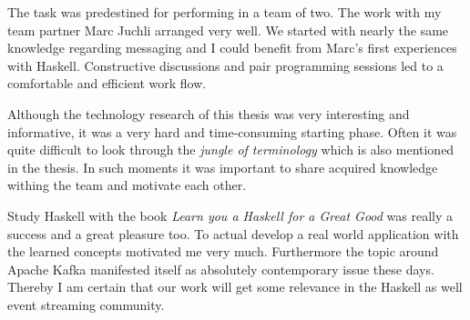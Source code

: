 The task was predestined for performing in a team of two. The work with my team
partner Marc Juchli arranged very well. We started with nearly the same
knowledge regarding messaging and I could benefit from Marc's first experiences
with Haskell. Constructive discussions and pair programming sessions led to a
comfortable and efficient work flow.

Although the technology research of this thesis was very interesting and
informative, it was a very hard and time-consuming starting phase. Often it was
quite difficult to look through the \textit{jungle of terminology} which is also
mentioned in the thesis. In such moments it was important to share acquired
knowledge withing the team and motivate each other.

Study Haskell with the book \textit{Learn you a Haskell for a Great Good} was
really a success and a great pleasure too. To actual develop a real world
application with the learned concepts motivated me very much. Furthermore
the topic around Apache Kafka manifested itself as absolutely contemporary issue
these days. Thereby I am certain that our work will get some relevance in
the Haskell as well event streaming community.



